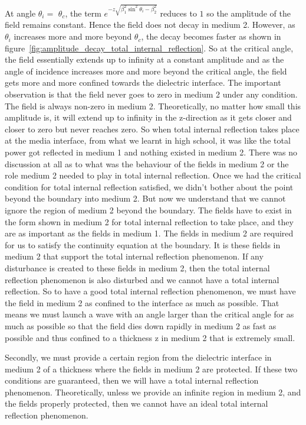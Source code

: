 At angle $\theta_i = $ $\theta_c$, the term $e^{-z\sqrt{\beta_1^2\sin^2\theta_i - \beta_2^{2}}}$ reduces to $1$ so the amplitude of the field remains constant. Hence the field does not decay in medium 2. However, as $\theta_{i}$ increases more and more beyond $\theta_{c}$, the decay becomes faster as shown in figure~\ref{fig:amplitude_decay_total_internal_reflection}. 
So at the critical angle, the field essentially extends up to infinity at a constant amplitude and as the angle of incidence increases more and more beyond the critical angle, the field gets more and more confined towards the dielectric interface. The important observation is that the field never goes to zero in medium 2 under any condition. The field is always non-zero in medium 2. Theoretically, no matter how small this amplitude is, it will extend up to infinity in the z-direction as it gets closer and closer to zero but never reaches zero.
So when total internal reflection takes place at the media interface, from what we learnt in high school, it was like the total power got reflected in medium 1 and nothing existed in medium 2. There was no discussion at all as to what was the behaviour of the fields in medium 2 or the role medium 2 needed to play in total internal reflection. Once we had the critical condition for total internal reflection satisfied, we didn't bother about the point beyond the boundary into medium 2. But now we understand that we cannot ignore the region of medium 2 beyond the boundary. The fields have to exist in the form shown in medium 2 for total internal reflection to take place, and they are as important as the fields in medium 1. The fields in medium 2 are required for us to satisfy the continuity equation at the boundary. It is these fields in medium 2 that support the total internal reflection phenomenon. If any disturbance is created to these fields in medium 2, then the total internal reflection phenomenon is also disturbed and we cannot have a total internal reflection. So to have a good total internal reflection phenomenon, we must have the field in medium 2 as confined to the interface as much as possible. That means we must launch a wave with an angle larger than the critical angle for as much as possible so that the field dies down rapidly in medium 2 as fast as possible and thus confined to a thickness z in medium 2 that is extremely small.

Secondly, we must provide a certain region from the dielectric interface in medium 2 of a thickness where the fields in medium 2 are protected. If these two conditions are guaranteed, then we will have a total internal reflection phenomenon. Theoretically, unless we provide an infinite region in medium 2, and the fields properly protected, then we cannot have an ideal total internal reflection phenomenon.

